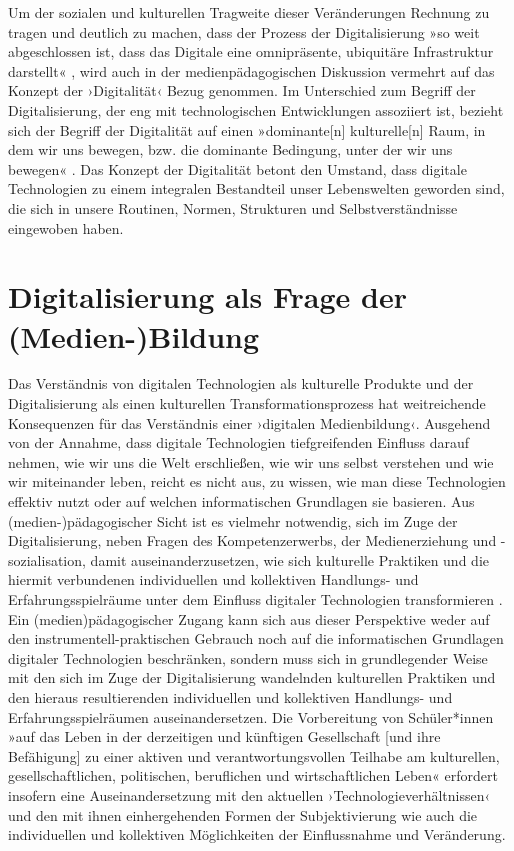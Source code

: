 \documentclass[
  a4paper,
]{book}
\begin{document}
Um der sozialen und kulturellen Tragweite dieser Veränderungen Rechnung zu tragen und deutlich zu machen, dass der Prozess der Digitalisierung »so weit abgeschlossen ist, dass das Digitale eine omnipräsente, ubiquitäre Infrastruktur darstellt« \citep[S. 69]{jorissenSubjektivationUndAsthetische2018}, wird auch in der medienpädagogischen Diskussion vermehrt auf das Konzept der ›Digitalität‹ Bezug genommen. Im Unterschied zum Begriff der Digitalisierung, der eng mit technologischen Entwicklungen assoziiert ist, bezieht sich der Begriff der Digitalität auf einen »dominante{[}n{]} kulturelle{[}n{]} Raum, in dem wir uns bewegen, bzw. die dominante Bedingung, unter der wir uns bewegen« \citep[S. 4]{stalderWasIstDigitalitaet2021}. Das Konzept der Digitalität betont den Umstand, dass digitale Technologien zu einem integralen Bestandteil unser Lebenswelten geworden sind, die sich in unsere Routinen, Normen, Strukturen und Selbstverständnisse eingewoben haben.

\section{Digitalisierung als Frage der (Medien-)Bildung}\label{digitalisierung-als-frage-der-medien-bildung}

Das Verständnis von digitalen Technologien als kulturelle Produkte und der Digitalisierung als einen kulturellen Transformationsprozess hat weitreichende Konsequenzen für das Verständnis einer ›digitalen Medienbildung‹. Ausgehend von der Annahme, dass digitale Technologien tiefgreifenden Einfluss darauf nehmen, wie wir uns die Welt erschließen, wie wir uns selbst verstehen und wie wir miteinander leben, reicht es nicht aus, zu wissen, wie man diese Technologien effektiv nutzt oder auf welchen informatischen Grundlagen sie basieren. Aus (medien-)pädagogischer Sicht ist es vielmehr notwendig, sich im Zuge der Digitalisierung, neben Fragen des Kompetenzerwerbs, der Medienerziehung und -sozialisation, damit auseinanderzusetzen, wie sich kulturelle Praktiken und die hiermit verbundenen individuellen und kollektiven Handlungs- und Erfahrungsspielräume unter dem Einfluss digitaler Technologien transformieren \citep{munte-goussarMedienbildungSchulkulturUnd2016}. Ein (medien)pädagogischer Zugang kann sich aus dieser Perspektive weder auf den instrumentell-praktischen Gebrauch noch auf die informatischen Grundlagen digitaler Technologien beschränken, sondern muss sich in grundlegender Weise mit den sich im Zuge der Digitalisierung wandelnden kulturellen Praktiken und den hieraus resultierenden individuellen und kollektiven Handlungs- und Erfahrungsspielräumen auseinandersetzen. Die Vorbereitung von Schüler*innen »auf das Leben in der derzeitigen und künftigen Gesellschaft {[}und ihre Befähigung{]} zu einer aktiven und verantwortungsvollen Teilhabe am kulturellen, gesellschaftlichen, politischen, beruflichen und wirtschaftlichen Leben« \citep{kultusministerkonferenzBildungDigitalenWelt2016} erfordert insofern eine Auseinandersetzung mit den aktuellen ›Technologieverhältnissen‹ \citep{zornSelbstWeltUnd2014} und den mit ihnen einhergehenden Formen der Subjektivierung wie auch die individuellen und kollektiven Möglichkeiten der Einflussnahme und Veränderung.
\end{document}
